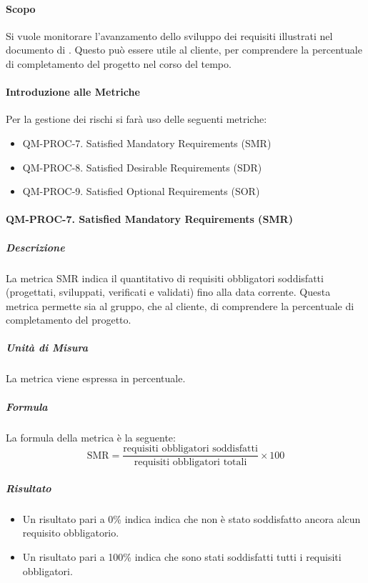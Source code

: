 		\paragraph{Scopo}
		
		Si vuole monitorare l'avanzamento dello sviluppo dei requisiti illustrati nel documento di . Questo può essere utile al cliente, per comprendere la percentuale di completamento del progetto nel corso del tempo.

		\paragraph{Introduzione alle Metriche}

		Per la gestione dei rischi si farà uso delle seguenti metriche:

		\begin{itemize}
			\item QM-PROC-7. Satisfied Mandatory Requirements (SMR)
			\item QM-PROC-8. Satisfied Desirable Requirements (SDR)
			\item QM-PROC-9. Satisfied Optional Requirements (SOR)
		\end{itemize}

		\paragraph{QM-PROC-7. Satisfied Mandatory Requirements (SMR)}

			\subparagraph{Descrizione}
			La metrica SMR indica il quantitativo di requisiti obbligatori soddisfatti (progettati, sviluppati, verificati e validati) fino alla data corrente. Questa metrica permette sia al gruppo, che al cliente, di comprendere la percentuale di completamento del progetto. 

			\subparagraph{Unità di Misura}
			La metrica viene espressa in percentuale.

			\subparagraph{Formula}
			La formula della metrica è la seguente:
			\[
				\text{SMR} = \frac{\text{requisiti obbligatori soddisfatti}}{\text{requisiti obbligatori totali}} \times 100
			\]

			\subparagraph{Risultato}
			\begin{itemize}
				\item Un risultato pari a 0\% indica indica che non è stato soddisfatto ancora alcun requisito obbligatorio.
				\item Un risultato pari a 100\% indica che sono stati soddisfatti tutti i requisiti obbligatori.
			\end{itemize}

